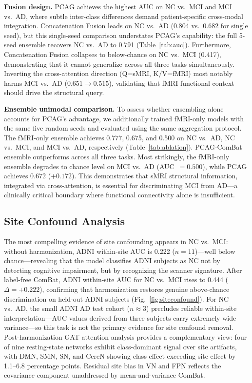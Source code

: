 \documentclass[conference]{IEEEtran}
\begin{document}
\textbf{Fusion design.} PCAG achieves the highest AUC on NC vs.\ MCI and MCI vs.\ AD, where subtle inter-class differences demand patient-specific cross-modal integration. Concatenation Fusion leads on NC vs.\ AD (0.804 vs.\ 0.682 for single seed), but this single-seed comparison understates PCAG's capability: the full 5-seed ensemble recovers NC vs.\ AD to 0.791 (Table~\ref{tab:auc}). Furthermore, Concatenation Fusion collapses to below-chance on NC vs.\ MCI (0.417), demonstrating that it cannot generalize across all three tasks simultaneously. Inverting the cross-attention direction (Q=sMRI, K/V=fMRI) most notably harms MCI vs.\ AD ($0.651{\to}0.515$), validating that fMRI functional context should drive the structural query.

\textbf{Ensemble unimodal comparison.} To assess whether ensembling alone accounts for PCAG's advantage, we additionally trained fMRI-only models with the same five random seeds and evaluated using the same aggregation protocol. The fMRI-only ensemble achieves 0.777, 0.675, and 0.500 on NC vs.\ AD, NC vs.\ MCI, and MCI vs.\ AD, respectively (Table~\ref{tab:ablation}). PCAG-ComBat ensemble outperforms across all three tasks. Most strikingly, the fMRI-only ensemble degrades to chance level on MCI vs.\ AD (AUC~$=0.500$), while PCAG achieves 0.672 ($+0.172$). This demonstrates that sMRI structural information, integrated via cross-attention, is essential for discriminating MCI from AD---a clinically critical boundary where functional connectivity alone is insufficient.

\subsection{Site Confound Analysis}
\label{sec:site}

The most compelling evidence of site confounding appears in NC vs.\ MCI: without harmonization, ADNI within-site AUC is 0.222 ($n{=}11$)---well below chance---revealing that the model classifies ADNI subjects as NC not by detecting cognitive impairment, but by recognizing the scanner signature. After label-free ComBat, ADNI within-site AUC for NC vs.\ MCI rises to 0.444 ($\Delta{=}{+}0.222$), confirming that harmonization restores genuine above-chance discrimination on held-out ADNI subjects (Fig.~\ref{fig:siteconfound}). For NC vs.\ AD, the small ADNI AD test cohort ($n{\approx}3$) precludes reliable within-site interpretation---AUC values derived from three subjects carry extremely wide variance---so this task is not the primary evidence for site confound removal. Post-harmonization GAT attention analysis provides a complementary view: four of nine resting-state networks exhibit class-dominant signal over site artifacts, with DMN, SMN, SN, and CereN showing class effect exceeding site effect by 1.1--6.8 percentage points. Residual site bias in VN and FPN reflects the covariance component unaddressed by mean-and-variance ComBat.
\end{document}
